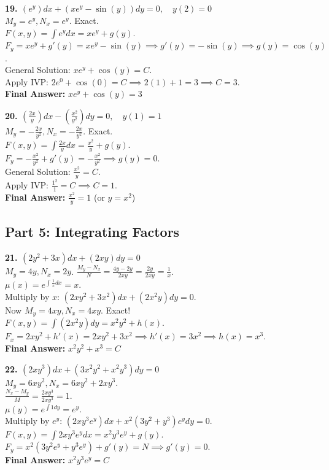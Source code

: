 \documentclass[11pt]{article}
\begin{document}
\textbf{19. $(e^y)dx + (x e^y - \sin(y))dy = 0, \quad y(2) = 0$} \\
$M_y = e^y, N_x = e^y$. Exact. \\
$F(x,y) = \int e^y dx = x e^y + g(y)$. \\
$F_y = x e^y + g'(y) = x e^y - \sin(y) \implies g'(y) = -\sin(y) \implies g(y) = \cos(y)$. \\
General Solution: $x e^y + \cos(y) = C$. \\
Apply IVP: $2 e^0 + \cos(0) = C \implies 2(1) + 1 = 3 \implies C = 3$. \\
\textbf{Final Answer:} $x e^y + \cos(y) = 3$

\textbf{20. $(\frac{2x}{y})dx - (\frac{x^2}{y^2})dy = 0, \quad y(1) = 1$} \\
$M_y = -\frac{2x}{y^2}, N_x = -\frac{2x}{y^2}$. Exact. \\
$F(x,y) = \int \frac{2x}{y} dx = \frac{x^2}{y} + g(y)$. \\
$F_y = -\frac{x^2}{y^2} + g'(y) = -\frac{x^2}{y^2} \implies g(y) = 0$. \\
General Solution: $\frac{x^2}{y} = C$. \\
Apply IVP: $\frac{1^2}{1} = C \implies C = 1$. \\
\textbf{Final Answer:} $\frac{x^2}{y} = 1$ (or $y = x^2$)

\subsection*{Part 5: Integrating Factors}

\textbf{21. $(2y^2 + 3x)dx + (2xy)dy = 0$} \\
$M_y = 4y, N_x = 2y$. $\frac{M_y - N_x}{N} = \frac{4y - 2y}{2xy} = \frac{2y}{2xy} = \frac{1}{x}$. \\
$\mu(x) = e^{\int \frac{1}{x} dx} = x$. \\
Multiply by $x$: $(2xy^2 + 3x^2)dx + (2x^2 y)dy = 0$. \\
Now $M_y = 4xy, N_x = 4xy$. Exact! \\
$F(x,y) = \int (2x^2 y) dy = x^2 y^2 + h(x)$. \\
$F_x = 2xy^2 + h'(x) = 2xy^2 + 3x^2 \implies h'(x) = 3x^2 \implies h(x) = x^3$. \\
\textbf{Final Answer:} $x^2 y^2 + x^3 = C$

\textbf{22. $(2xy^3)dx + (3x^2 y^2 + x^2 y^3)dy = 0$} \\
$M_y = 6xy^2, N_x = 6xy^2 + 2x y^3$. \\
$\frac{N_x - M_y}{M} = \frac{2x y^3}{2x y^3} = 1$. \\
$\mu(y) = e^{\int 1 dy} = e^y$. \\
Multiply by $e^y$: $(2x y^3 e^y)dx + x^2(3y^2 + y^3)e^y dy = 0$. \\
$F(x,y) = \int 2xy^3 e^y dx = x^2 y^3 e^y + g(y)$. \\
$F_y = x^2(3y^2 e^y + y^3 e^y) + g'(y) = N \implies g'(y) = 0$. \\
\textbf{Final Answer:} $x^2 y^3 e^y = C$
\end{document}
